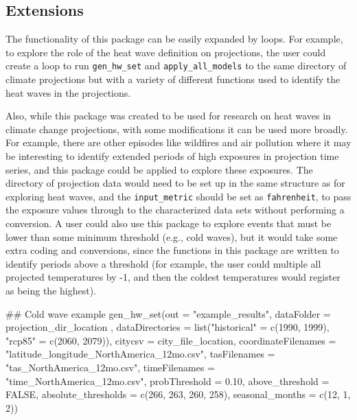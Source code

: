 \subsection{Extensions}\label{extensions}

The functionality of this package can be easily expanded by loops. For
example, to explore the role of the heat wave definition on projections,
the user could create a loop to run \texttt{gen\_hw\_set} and
\texttt{apply\_all\_models} to the same directory of climate projections
but with a variety of different functions used to identify the heat
waves in the projections.

Also, while this package was created to be used for research on heat
waves in climate change projections, with some modifications it can be
used more broadly. For example, there are other episodes like wildfires
and air pollution where it may be interesting to identify extended
periods of high exposures in projection time series, and this package
could be applied to explore these exposures. The directory of projection
data would need to be set up in the same structure as for exploring heat
waves, and the \texttt{input\_metric} should be set as
\texttt{fahrenheit}, to pass the exposure values through to the
characterized data sets without performing a conversion. A user could
also use this package to explore events that must be lower than some
minimum threshold (e.g., cold waves), but it would take some extra
coding and conversions, since the functions in this package are written
to identify periods above a threshold (for example, the user could
multiple all projected temperatures by -1, and then the coldest
temperatures would register as being the highest).

\begin{Schunk}
\begin{Sinput}
## Cold wave example
gen_hw_set(out = "example_results",
           dataFolder = projection_dir_location ,
           dataDirectories = list("historical" = c(1990, 1999),
                                  "rcp85" = c(2060, 2079)),
           citycsv = city_file_location,
           coordinateFilenames = "latitude_longitude_NorthAmerica_12mo.csv",
           tasFilenames = "tas_NorthAmerica_12mo.csv",
           timeFilenames = "time_NorthAmerica_12mo.csv", 
           probThreshold = 0.10, 
           above_threshold = FALSE, 
           absolute_thresholds = c(266, 263, 260, 258), 
           seasonal_months = c(12, 1, 2))
\end{Sinput}
\end{Schunk}

